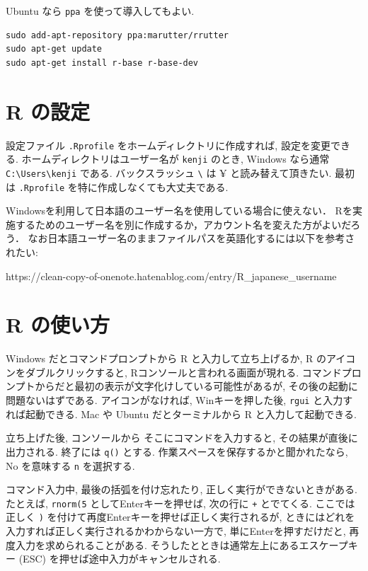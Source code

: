 \documentclass[
  letterpaper,
  xelatex,
  ja=standard, xelatex]{bxjsbook}
\begin{document}
Ubuntu なら \texttt{ppa} を使って導入してもよい.

\begin{verbatim}
sudo add-apt-repository ppa:marutter/rrutter
sudo apt-get update
sudo apt-get install r-base r-base-dev
\end{verbatim}

\section{R の設定}\label{r-ux306eux8a2dux5b9a}

設定ファイル \texttt{.Rprofile} をホームディレクトリに作成すれば,
設定を変更できる. ホームディレクトリはユーザー名が \texttt{kenji}
のとき, Windows なら通常
\texttt{C:\textbackslash{}Users\textbackslash{}kenji} である.
バックスラッシュ \texttt{\textbackslash{}} は \(\yen\)
と読み替えて頂きたい. 最初は \texttt{.Rprofile}
を特に作成しなくても大丈夫である.

Windowsを利用して日本語のユーザー名を使用している場合に使えない．
Rを実施するためのユーザー名を別に作成するか，アカウント名を変えた方がよいだろう．
なお日本語ユーザー名のままファイルパスを英語化するには以下を参考されたい:

https://clean-copy-of-onenote.hatenablog.com/entry/R\_japanese\_username

\section{R の使い方}\label{r-ux306eux4f7fux3044ux65b9}

Windows だとコマンドプロンプトから R と入力して立ち上げるか, R
のアイコンをダブルクリックすると, Rコンソールと言われる画面が現れる.
コマンドプロンプトからだと最初の表示が文字化けしている可能性があるが,
その後の起動に問題ないはずである. アイコンがなければ, Winキーを押した後,
\texttt{rgui} と入力すれば起動できる. Mac や Ubuntu だとターミナルから R
と入力して起動できる.

立ち上げた後, コンソールから そこにコマンドを入力すると,
その結果が直後に出力される. 終了には \texttt{q()} とする.
作業スペースを保存するかと聞かれたなら, No を意味する \texttt{n}
を選択する.

コマンド入力中, 最後の括弧を付け忘れたり,
正しく実行ができないときがある. たとえば, \texttt{rnorm(5}
としてEnterキーを押せば, 次の行に \texttt{+} とでてくる. ここでは正しく
\texttt{)} を付けて再度Enterキーを押せば正しく実行されるが,
ときにはどれを入力すれば正しく実行されるかわからない一方で,
単にEnterを押すだけだと, 再度入力を求められることがある.
そうしたとときは通常左上にあるエスケープキー (ESC)
を押せば途中入力がキャンセルされる.
\end{document}
